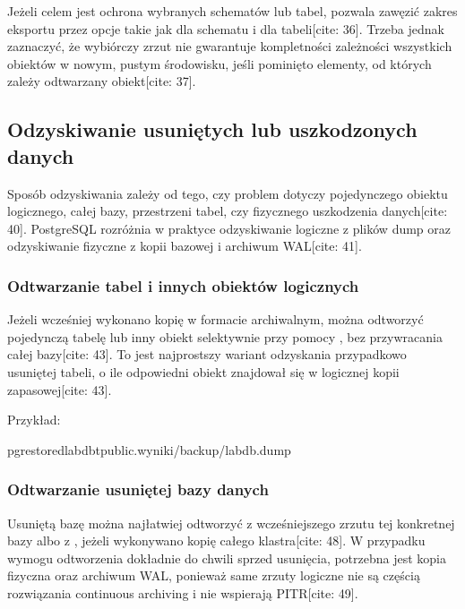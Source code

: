 \documentclass[letterpaper,10pt,polish]{sphinxmanual}
\begin{document}
\sphinxAtStartPar
Jeżeli celem jest ochrona wybranych schematów lub tabel,  pozwala zawęzić zakres eksportu przez opcje takie jak  dla schematu i  dla tabeli{[}cite: 36{]}. Trzeba jednak zaznaczyć, że wybiórczy zrzut nie gwarantuje kompletności zależności wszystkich obiektów w nowym, pustym środowisku, jeśli pominięto elementy, od których zależy odtwarzany obiekt{[}cite: 37{]}.


\subsection{Odzyskiwanie usuniętych lub uszkodzonych danych}
\label{\detokenize{rozdzial_2/rozdzial_28/index:odzyskiwanie-usunietych-lub-uszkodzonych-danych}}
\sphinxAtStartPar
Sposób odzyskiwania zależy od tego, czy problem dotyczy pojedynczego obiektu logicznego, całej bazy, przestrzeni tabel, czy fizycznego uszkodzenia danych{[}cite: 40{]}. PostgreSQL rozróżnia w praktyce odzyskiwanie logiczne z plików dump oraz odzyskiwanie fizyczne z kopii bazowej i archiwum WAL{[}cite: 41{]}.


\subsubsection{Odtwarzanie tabel i innych obiektów logicznych}
\label{\detokenize{rozdzial_2/rozdzial_28/index:odtwarzanie-tabel-i-innych-obiektow-logicznych}}
\sphinxAtStartPar
Jeżeli wcześniej wykonano kopię  w formacie archiwalnym, można odtworzyć pojedynczą tabelę lub inny obiekt selektywnie przy pomocy , bez przywracania całej bazy{[}cite: 43{]}. To jest najprostszy wariant odzyskania przypadkowo usuniętej tabeli, o ile odpowiedni obiekt znajdował się w logicznej kopii zapasowej{[}cite: 43{]}.

\sphinxAtStartPar
Przykład:

\begin{sphinxVerbatim}[commandchars=\\\{\}]
pg\PYGZus{}restore\PYGZhy{}dlabdb\PYGZhy{}tpublic.wyniki/backup/labdb.dump
\end{sphinxVerbatim}


\subsubsection{Odtwarzanie usuniętej bazy danych}
\label{\detokenize{rozdzial_2/rozdzial_28/index:odtwarzanie-usunietej-bazy-danych}}
\sphinxAtStartPar
Usuniętą bazę można najłatwiej odtworzyć z wcześniejszego zrzutu  tej konkretnej bazy albo z , jeżeli wykonywano kopię całego klastra{[}cite: 48{]}. W przypadku wymogu odtworzenia dokładnie do chwili sprzed usunięcia, potrzebna jest kopia fizyczna oraz archiwum WAL, ponieważ same zrzuty logiczne nie są częścią rozwiązania continuous archiving i nie wspierają PITR{[}cite: 49{]}.
\end{document}
